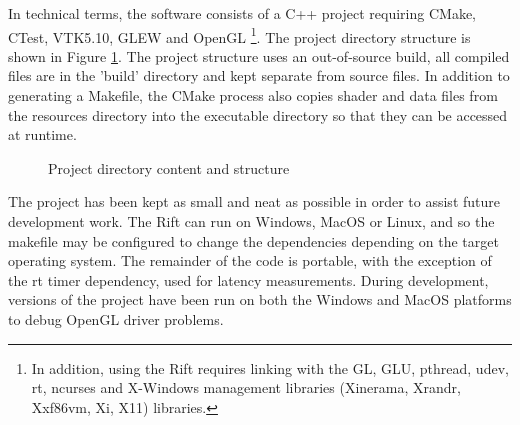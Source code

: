 \documentclass[MSc,paper=a4,pagesize=auto]{icldt}
\begin{document}
In technical terms, the software consists of a C++ project requiring CMake, CTest, VTK5.10, GLEW and OpenGL \footnote{In addition, using the Rift requires linking with the GL, GLU, pthread, udev, rt, ncurses and X-Windows management libraries (Xinerama, Xrandr, Xxf86vm, Xi, X11) libraries.}. The project directory structure is shown in Figure \ref{fig:project_directory_structure}. The project structure uses an out-of-source build, all compiled files are in the 'build' directory and kept separate from source files. In addition to generating a Makefile, the CMake process also copies shader and data files from the resources directory into the executable directory so that they can be accessed at runtime.

\begin{figure}
\centering
{}
\caption{Project directory content and structure}
\label{fig:project_directory_structure}
\end{figure}

The project has been kept as small and neat as possible in order to assist future development work. The Rift can run on Windows, MacOS or Linux, and so the makefile may be configured to change the dependencies depending on the target operating system. The remainder of the code is portable, with the exception of the rt timer dependency, used for latency measurements. During development, versions of the project have been run on both the Windows and MacOS platforms to debug OpenGL driver problems.
\end{document}
